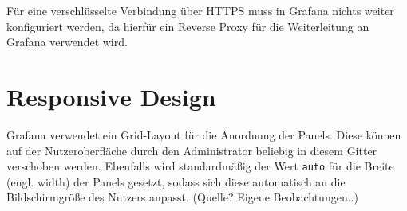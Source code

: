 Für eine verschlüsselte Verbindung über HTTPS muss in Grafana nichts weiter konfiguriert werden, da hierfür ein Reverse Proxy für die Weiterleitung an Grafana verwendet wird.

\section{Responsive Design}
\label{sec:responsive-design}
Grafana verwendet ein Grid-Layout für die Anordnung der Panels. Diese können auf der Nutzeroberfläche durch den Administrator beliebig in diesem Gitter verschoben werden. Ebenfalls wird standardmäßig der Wert \verb|auto| für die Breite (engl. width) der Panels gesetzt, sodass sich diese automatisch an die Bildschirmgröße des Nutzers anpasst. (Quelle? Eigene Beobachtungen..)